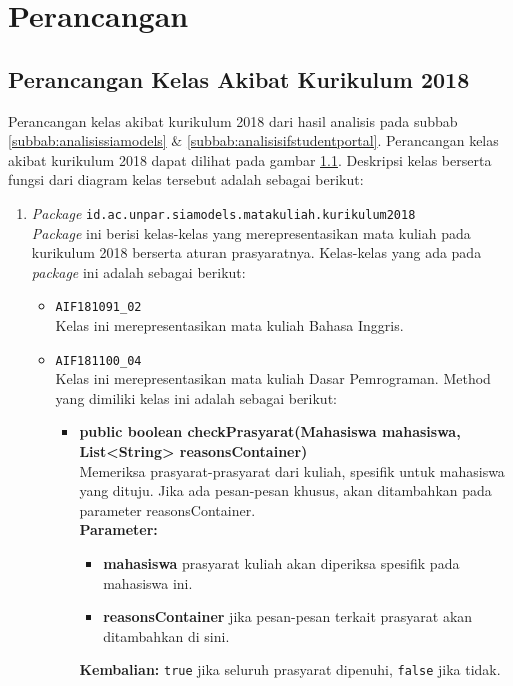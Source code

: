 \chapter{Perancangan}
\label{chap:perancangan}

\section{Perancangan Kelas Akibat Kurikulum 2018}

Perancangan kelas akibat kurikulum 2018 dari hasil analisis pada subbab \ref{subbab:analisissiamodels} \& \ref{subbab:analisisifstudentportal}. Perancangan kelas akibat kurikulum 2018 dapat dilihat pada gambar \ref{}. Deskripsi kelas berserta fungsi dari diagram kelas tersebut adalah sebagai berikut:
\begin{enumerate}
	\item \textit{Package} \texttt{id.ac.unpar.siamodels.matakuliah.kurikulum2018} \\
	\textit{Package} ini berisi kelas-kelas yang merepresentasikan mata kuliah pada kurikulum 2018 berserta aturan prasyaratnya. Kelas-kelas yang ada pada \textit{package} ini adalah sebagai berikut:
	\begin{itemize}
		\item \texttt{AIF181091\_02} \\
		Kelas ini merepresentasikan mata kuliah Bahasa Inggris.
		\item \texttt{AIF181100\_04} \\
		Kelas ini merepresentasikan mata kuliah Dasar Pemrograman. Method yang dimiliki kelas ini adalah sebagai berikut: 
		\begin{itemize}
			\item \textbf{public boolean checkPrasyarat(Mahasiswa mahasiswa, List<String> reasonsContainer)}\\
			Memeriksa prasyarat-prasyarat dari kuliah, spesifik untuk mahasiswa yang dituju. Jika ada pesan-pesan khusus, akan ditambahkan pada parameter reasonsContainer.\\
			\textbf{Parameter:}
			\begin{itemize}
				\item \textbf{mahasiswa} prasyarat kuliah akan diperiksa spesifik pada mahasiswa ini.
				\item \textbf{reasonsContainer} jika pesan-pesan terkait prasyarat akan ditambahkan di sini.
			\end{itemize}
			\textbf{Kembalian:} \texttt{true} jika seluruh prasyarat dipenuhi, \texttt{false} jika tidak.

\end{itemize}
\end{itemize}
\end{enumerate}
